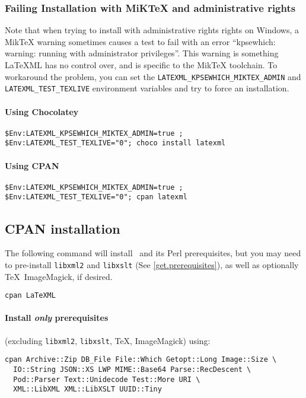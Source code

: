 \documentclass{article}
\begin{document}
\subsubsection*{Failing Installation with MiKTeX and administrative rights}\label{get.windows.miktexbug}

Note that when trying to install with administrative rights rights on Windows, a 
MikTeX warning sometimes causes a test to fail with an error
``kpsewhich: warning: running with administrator privileges''.
This warning is something LaTeXML has no control over, and is specific to the MikTeX toolchain.
To workaround the problem, you can set the \lstinline{LATEXML_KPSEWHICH_MIKTEX_ADMIN}
and \lstinline{LATEXML_TEST_TEXLIVE} environment variables and try to force an installation.

\paragraph*{Using Chocolatey}
\begin{lstlisting}[style=shell]
$Env:LATEXML_KPSEWHICH_MIKTEX_ADMIN=true ; $Env:LATEXML_TEST_TEXLIVE="0"; choco install latexml
\end{lstlisting}

\paragraph*{Using CPAN}
\begin{lstlisting}[style=shell]
$Env:LATEXML_KPSEWHICH_MIKTEX_ADMIN=true ; $Env:LATEXML_TEST_TEXLIVE="0"; cpan latexml
\end{lstlisting}

\subsection{CPAN installation}\label{get.cpan}
The following command will install \LaTeXML\ and its Perl prerequisites,
but you may need to pre-install \texttt{libxml2} and  \texttt{libxslt} (See \ref{get.prerequisites}),
as well as optionally \TeX\, ImageMagick, if desired.
\begin{lstlisting}[style=shell]
cpan LaTeXML
\end{lstlisting}

\paragraph*{Install \emph{only}  prerequisites}\label{get.cpan.prereq}
(excluding  \texttt{libxml2},  \texttt{libxslt}, \TeX, ImageMagick)
using:
\begin{lstlisting}[style=shell]
cpan Archive::Zip DB_File File::Which Getopt::Long Image::Size \
  IO::String JSON::XS LWP MIME::Base64 Parse::RecDescent \
  Pod::Parser Text::Unidecode Test::More URI \
  XML::LibXML XML::LibXSLT UUID::Tiny
\end{lstlisting}
\end{document}
